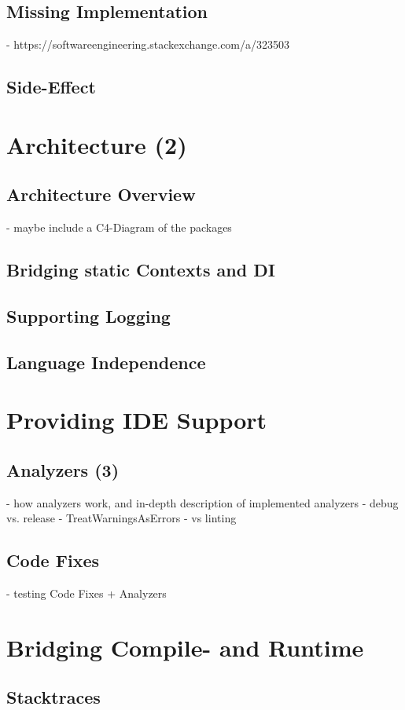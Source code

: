 \documentclass[master,english,smartquotes]{hgbthesis}
\begin{document}
\subsection{Missing Implementation}
- https://softwareengineering.stackexchange.com/a/323503
\subsection{Side-Effect}
\section{Architecture (2)}
\subsection{Architecture Overview}
- maybe include a C4-Diagram of the packages
\subsection{Bridging static Contexts and DI}
\subsection{Supporting Logging}
\subsection{Language Independence}
\section{Providing IDE Support}
\subsection{Analyzers (3)}
- how analyzers work, and in-depth description of implemented analyzers
- debug vs. release
- TreatWarningsAsErrors
- vs linting
\subsection{Code Fixes}
- testing Code Fixes + Analyzers
\section{Bridging Compile- and Runtime}
\subsection{Stacktraces}
\end{document}
